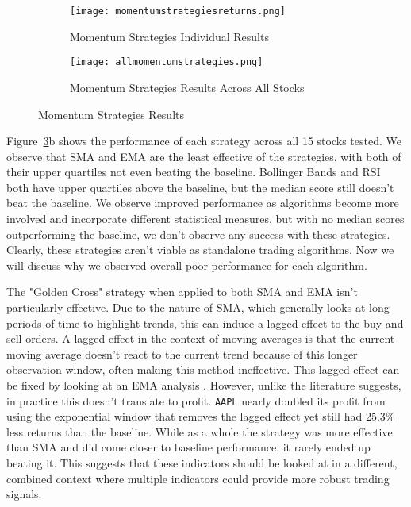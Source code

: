 \documentclass[../thesis.tex]{subfiles}
\begin{document}
\begin{figure}[h!]
\centering

\begin{subfigure}[t]{0.9\textwidth}
\texttt{[image: momentumstrategiesreturns.png]}
\caption{Momentum Strategies Individual Results\label{overflow}}
\end{subfigure}
\begin{subfigure}[t]{\textwidth}
\centering 
\texttt{[image: allmomentumstrategies.png]}
\caption{ Momentum Strategies Results Across All Stocks \label{overflow}}
\end{subfigure}

\caption{Momentum Strategies Results  \label{overflow}}
\label{MOMENTUMfigure}
\end{figure}


Figure~\ref{MOMENTUMfigure}b shows the performance of each strategy across all 15 stocks tested. We observe that SMA and EMA are the least effective of the strategies, with both of their upper quartiles not even beating the baseline. Bollinger Bands and RSI both have upper quartiles above the baseline, but the median score still doesn't beat the baseline. We observe improved performance as algorithms become more involved and incorporate different statistical measures, but with no median scores outperforming the baseline, we don't observe any success with these strategies. Clearly, these strategies aren't viable as standalone trading algorithms. Now we will discuss why we observed overall poor performance for each algorithm.

The "Golden Cross" strategy when applied to both SMA and EMA isn't particularly effective. Due to the nature of SMA, which generally looks at long periods of time to highlight trends, this can induce a lagged effect to the buy and sell orders. A lagged effect in the context of moving averages is that the current moving average doesn't react to the current trend because of this longer observation window, often making this method ineffective. This lagged effect can be fixed by looking at an EMA analysis \cite{Ehlers}. However, unlike the literature suggests, in practice this doesn't translate to profit. \texttt{AAPL} nearly doubled its profit from using the exponential window that removes the lagged effect yet still had 25.3\% less returns than the baseline. While as a whole the strategy was more effective than SMA and did come closer to baseline performance, it rarely ended up beating it. This suggests that these indicators should be looked at in a different, combined context where multiple indicators could provide more robust trading signals.
\end{document}
